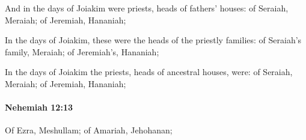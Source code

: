 			\begin{versebox}
					\item[BHS] 
					\item[LXX] 
					\item[ASV] And in the days of Joiakim were priests, heads of fathers' houses: of Seraiah, Meraiah; of Jeremiah, Hananiah;
					\item[NIV] In the days of Joiakim, these were the heads of the priestly families: of Seraiah’s family, Meraiah; of Jeremiah’s, Hananiah;
					\item[NRSV] In the days of Joiakim the priests, heads of ancestral houses, were: of Seraiah, Meraiah; of Jeremiah, Hananiah;
			\end{versebox}

		\paragraph{Nehemiah 12:13} %
			\label{NEHEMIAH-12-13}

			Of Ezra, Meshullam; of Amariah, Jehohanan;

